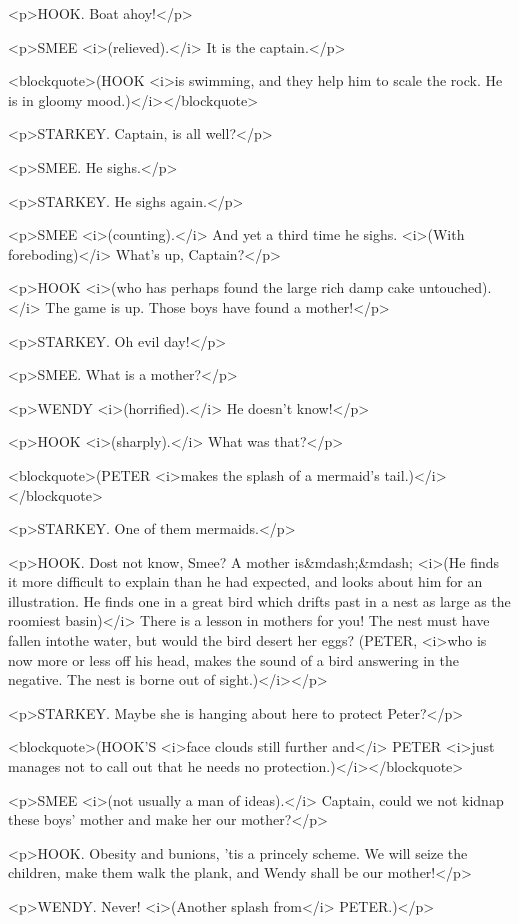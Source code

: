 <p>HOOK. Boat ahoy!</p>

<p>SMEE <i>(relieved).</i> It is the captain.</p>

<blockquote>(HOOK <i>is swimming, and they help him to scale the rock. He is in gloomy mood.)</i></blockquote>

<p>STARKEY. Captain, is all well?</p>

<p>SMEE. He sighs.</p>

<p>STARKEY. He sighs again.</p>

<p>SMEE <i>(counting).</i> And yet a third time he sighs. <i>(With foreboding)</i> What's up, Captain?</p>

<p>HOOK <i>(who has perhaps found the large rich damp cake untouched).</i> The game is up. Those boys have found a mother!</p>

<p>STARKEY. Oh evil day!</p>

<p>SMEE. What is a mother?</p>

<p>WENDY <i>(horrified).</i> He doesn't know!</p>

<p>HOOK <i>(sharply).</i> What was that?</p>

<blockquote>(PETER <i>makes the splash of a mermaid's tail.)</i></blockquote>

<p>STARKEY. One of them mermaids.</p>

<p>HOOK. Dost not know, Smee? A mother is&mdash;&mdash; <i>(He finds it more difficult to explain than he had expected, and looks about him for an illustration. He finds one in a great bird which drifts past in a nest as large as the roomiest basin)</i> There is a lesson in mothers for you! The nest must have fallen intothe water, but would the bird desert her eggs? (PETER, <i>who is now more or less off his head, makes the sound of a bird answering in the negative. The nest is borne out of sight.)</i></p>

<p>STARKEY. Maybe she is hanging about here to protect Peter?</p>

<blockquote>(HOOK'S <i>face clouds still further and</i> PETER <i>just manages not to call out that he needs no protection.)</i></blockquote>

<p>SMEE <i>(not usually a man of ideas).</i> Captain, could we not kidnap these boys' mother and make her our mother?</p>

<p>HOOK. Obesity and bunions, 'tis a princely scheme. We will seize the children, make them walk the plank, and Wendy shall be our mother!</p>

<p>WENDY. Never! <i>(Another splash from</i> PETER.)</p>

